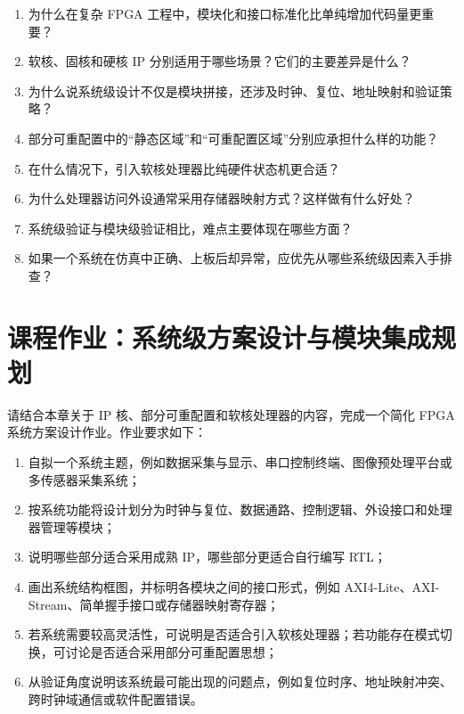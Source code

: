 \begin{enumerate}
\def\labelenumi{\arabic{enumi}.}
\tightlist
\item
  为什么在复杂 FPGA 工程中，模块化和接口标准化比单纯增加代码量更重要？\\
\item
  软核、固核和硬核 IP 分别适用于哪些场景？它们的主要差异是什么？\\
\item
  为什么说系统级设计不仅是模块拼接，还涉及时钟、复位、地址映射和验证策略？\\
\item
  部分可重配置中的``静态区域''和``可重配置区域''分别应承担什么样的功能？\\
\item
  在什么情况下，引入软核处理器比纯硬件状态机更合适？\\
\item
  为什么处理器访问外设通常采用存储器映射方式？这样做有什么好处？\\
\item
  系统级验证与模块级验证相比，难点主要体现在哪些方面？\\
\item
  如果一个系统在仿真中正确、上板后却异常，应优先从哪些系统级因素入手排查？
\end{enumerate}

\section{课程作业：系统级方案设计与模块集成规划}\label{ux8bfeux7a0bux4f5cux4e1aux7cfbux7edfux7ea7ux65b9ux6848ux8bbeux8ba1ux4e0eux6a21ux5757ux96c6ux6210ux89c4ux5212}

请结合本章关于 IP 核、部分可重配置和软核处理器的内容，完成一个简化 FPGA
系统方案设计作业。作业要求如下：

\begin{enumerate}
\def\labelenumi{\arabic{enumi}.}
\tightlist
\item
  自拟一个系统主题，例如数据采集与显示、串口控制终端、图像预处理平台或多传感器采集系统；
\item
  按系统功能将设计划分为时钟与复位、数据通路、控制逻辑、外设接口和处理器管理等模块；
\item
  说明哪些部分适合采用成熟 IP，哪些部分更适合自行编写 RTL；
\item
  画出系统结构框图，并标明各模块之间的接口形式，例如
  AXI4-Lite、AXI-Stream、简单握手接口或存储器映射寄存器；
\item
  若系统需要较高灵活性，可说明是否适合引入软核处理器；若功能存在模式切换，可讨论是否适合采用部分可重配置思想；
\item
  从验证角度说明该系统最可能出现的问题点，例如复位时序、地址映射冲突、跨时钟域通信或软件配置错误。
\end{enumerate}

